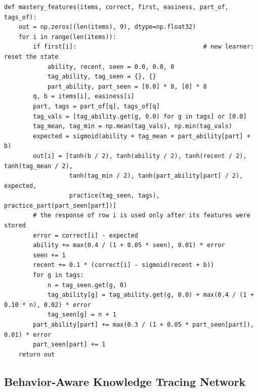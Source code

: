 \documentclass[11pt]{article}
\begin{document}
\begin{lstlisting}[caption={Causal computation of the difficulty-adjusted mastery features.},label={alg:elo}]
def mastery_features(items, correct, first, easiness, part_of, tags_of):
    out = np.zeros((len(items), 9), dtype=np.float32)
    for i in range(len(items)):
        if first[i]:                                   # new learner: reset the state
            ability, recent, seen = 0.0, 0.0, 0
            tag_ability, tag_seen = {}, {}
            part_ability, part_seen = [0.0] * 8, [0] * 8
        q, b = items[i], easiness[i]
        part, tags = part_of[q], tags_of[q]
        tag_vals = [tag_ability.get(g, 0.0) for g in tags] or [0.0]
        tag_mean, tag_min = np.mean(tag_vals), np.min(tag_vals)
        expected = sigmoid(ability + tag_mean + part_ability[part] + b)
        out[i] = [tanh(b / 2), tanh(ability / 2), tanh(recent / 2), tanh(tag_mean / 2),
                  tanh(tag_min / 2), tanh(part_ability[part] / 2), expected,
                  practice(tag_seen, tags), practice_part(part_seen[part])]
        # the response of row i is used only after its features were stored
        error = correct[i] - expected
        ability += max(0.4 / (1 + 0.05 * seen), 0.01) * error
        seen += 1
        recent += 0.1 * (correct[i] - sigmoid(recent + b))
        for g in tags:
            n = tag_seen.get(g, 0)
            tag_ability[g] = tag_ability.get(g, 0.0) + max(0.4 / (1 + 0.10 * n), 0.02) * error
            tag_seen[g] = n + 1
        part_ability[part] += max(0.3 / (1 + 0.05 * part_seen[part]), 0.01) * error
        part_seen[part] += 1
    return out
\end{lstlisting}

\subsection{Behavior-Aware Knowledge Tracing Network}
\end{document}
